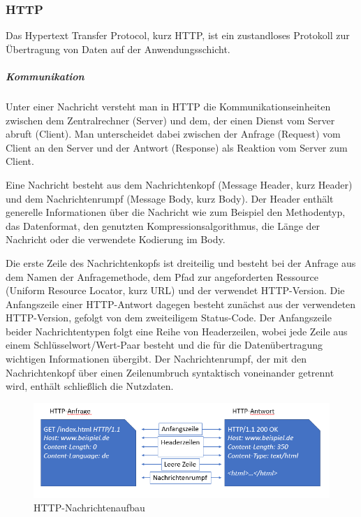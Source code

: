 \subsubsection{HTTP}
Das Hypertext Transfer Protocol, kurz HTTP, ist ein zustandloses Protokoll zur Übertragung von Daten auf der Anwendungsschicht.

\subparagraph{Kommunikation}
Unter einer Nachricht versteht man in HTTP die Kommunikationseinheiten zwischen dem Zentralrechner (Server) und dem, der einen Dienst vom Server abruft (Client). 
Man unterscheidet dabei zwischen der Anfrage (Request) vom Client an den Server und der Antwort (Response) als Reaktion vom Server zum Client. 
\newline

Eine Nachricht besteht aus dem Nachrichtenkopf (Message Header, kurz Header) und dem Nachrichtenrumpf (Message Body, kurz Body). 
Der Header enthält generelle Informationen über die Nachricht wie zum Beispiel den Methodentyp, das Datenformat, den genutzten Kompressionsalgorithmus, die Länge der Nachricht oder die verwendete Kodierung im Body. 
\newline

Die erste Zeile des Nachrichtenkopfs ist dreiteilig und besteht bei der Anfrage aus dem Namen der Anfragemethode, dem Pfad zur angeforderten Ressource (Uniform Resource Locator, kurz URL) und der verwendet HTTP-Version. Die Anfangszeile einer HTTP-Antwort dagegen besteht zunächst aus der verwendeten HTTP-Version, gefolgt von dem zweiteiligem Status-Code. 
Der Anfangszeile beider Nachrichtentypen folgt eine Reihe von Headerzeilen, wobei jede Zeile aus einem Schlüsselwort/Wert-Paar besteht und die für die Datenübertragung wichtigen Informationen übergibt. 
Der Nachrichtenrumpf, der mit den Nachrichtenkopf über einen Zeilenumbruch syntaktisch voneinander getrennt wird, enthält schließlich die Nutzdaten.
\newline

\begin{figure}[h]
\centering
\includegraphics[width=\textwidth]{images/netzwerkprotokolle_http.PNG}
\caption{HTTP-Nachrichtenaufbau}
\end{figure}

